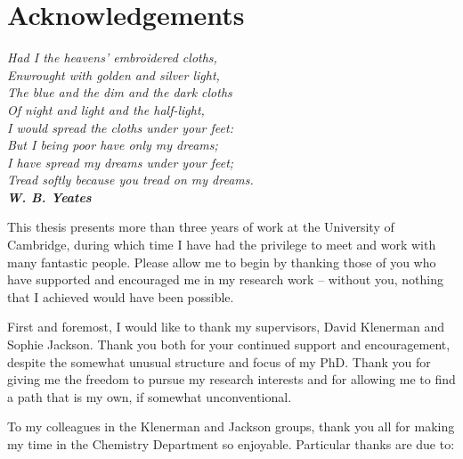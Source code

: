 \chapter*{Acknowledgements}
\emph{Had I the heavens' embroidered cloths,\\
	Enwrought with golden and silver light,\\
	The blue and the dim and the dark cloths\\
	Of night and light and the half-light,\\
	I would spread the cloths under your feet:\\
	But I being poor have only my dreams;\\
	I have spread my dreams under your feet;\\
	Tread softly because you tread on my dreams.\\
	\bf{W. B. Yeates}\\
}

This thesis presents more than three years of work at the University of Cambridge, during which time I have had the privilege to meet and work with many fantastic people. Please allow me to begin by thanking those of you who have supported and encouraged me in my research work -- without you, nothing that I achieved would have been possible.

First and foremost, I would like to thank my supervisors, David Klenerman and Sophie Jackson. Thank you both for your continued support and encouragement, despite the somewhat unusual structure and focus of my PhD. Thank you for giving me the freedom to pursue my research interests and for allowing me to find a path that is my own, if somewhat unconventional.

To my colleagues in the Klenerman and Jackson groups, thank you all for making my time in the Chemistry Department so enjoyable. Particular thanks are due to:

